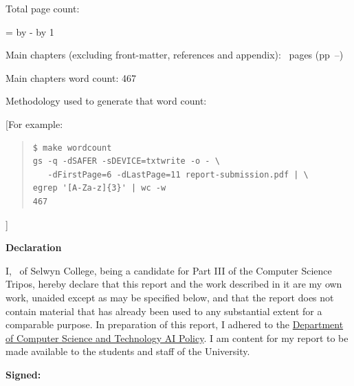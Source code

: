 \documentclass[12pt,a4paper,twoside]{report}
\newif\ifsubmission %
\newcommand{\candidatenumber}{1234N}
\newcommand{\college}{Selwyn College}
\newcommand{\coursefor}{Part III of the Computer Science Tripos}
\begin{document}
\begin{sffamily}
\newpage

Total page count: \pageref{lastpage}

\makeatletter
\@tempcnta=\relax%
\advance\@tempcnta by -%
\advance\@tempcnta by 1%
\xdef\contentpages{\the\@tempcnta}%
\makeatother

Main chapters (excluding front-matter, references and appendix):
\contentpages~pages
(pp~\pageref{firstcontentpage}--\pageref{lastcontentpage})

Main chapters word count: 467

Methodology used to generate that word count:

[For example:

\begin{quote}
\begin{verbatim}
$ make wordcount
gs -q -dSAFER -sDEVICE=txtwrite -o - \
   -dFirstPage=6 -dLastPage=11 report-submission.pdf | \
egrep '[A-Za-z]{3}' | wc -w
467
\end{verbatim}
\end{quote}

]

\end{sffamily}

\vspace{\fill}
\onehalfspacing
\textbf{\Huge Declaration}
\vspace{40pt}

I,
\makeatletter\ifsubmission
\candidatenumber,
\else
\@author\ of \college,
\fi\makeatother
being a candidate for \coursefor, hereby declare that this report and
the work described in it are my own work, unaided except as may be
specified below, and that the report does not contain material that
has already been used to any substantial extent for a comparable
purpose.
In preparation of this report, I adhered to the
\href{https://www.cst.cam.ac.uk/files/ai_policy.pdf}{Department of
Computer Science and Technology AI Policy}. I am content for
my report to be made available to the students and staff of the
University.



\ifsubmission\else
\bigskip
\textbf{Signed:}
\fi
\end{document}
